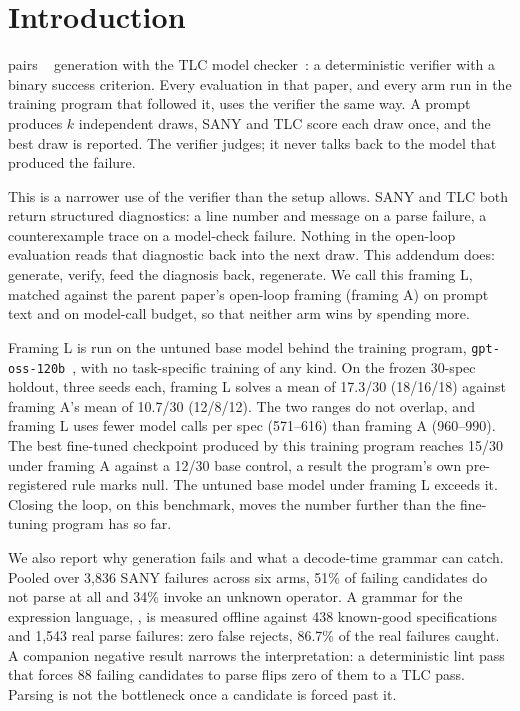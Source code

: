 \section{Introduction}\label{sec:introduction}

\ours{} pairs \tlaplus{}~\cite{lamport2002specifying} generation with the TLC
model checker~\cite{yu1999tlc}: a deterministic verifier with a binary success
criterion. Every evaluation in that paper, and every arm run in the training
program that followed it, uses the verifier the same way. A prompt produces
$k$ independent draws, SANY and TLC score each draw once, and the best draw is
reported. The verifier judges; it never talks back to the model that produced
the failure.

This is a narrower use of the verifier than the setup allows. SANY and TLC
both return structured diagnostics: a line number and message on a parse
failure, a counterexample trace on a model-check failure. Nothing in the
open-loop evaluation reads that diagnostic back into the next draw. This
addendum does: generate, verify, feed the diagnosis back, regenerate. We call
this framing L, matched against the parent paper's open-loop framing (framing
A) on prompt text and on model-call budget, so that neither arm wins by
spending more.

Framing L is run on the untuned base model behind the training program,
\texttt{gpt-oss-120b}~\cite{openai2025gptoss}, with no task-specific training
of any kind. On the frozen 30-spec holdout, three seeds each, framing L solves
a mean of 17.3/30 (18/16/18) against framing A's mean of 10.7/30 (12/8/12).
The two ranges do not overlap, and framing L uses fewer model calls per spec
(571--616) than framing A (960--990). The best fine-tuned checkpoint produced
by this training program reaches 15/30 under framing A against a 12/30 base
control, a result the program's own pre-registered rule marks null. The
untuned base model under framing L exceeds it. Closing the loop, on this
benchmark, moves the number further than the fine-tuning program has so far.

We also report why generation fails and what a decode-time grammar can catch.
Pooled over 3,836 SANY failures across six arms, 51\% of failing candidates do
not parse at all and 34\% invoke an unknown operator. A grammar for the
\tlaplus{} expression language, \gfile{}, is measured
offline against 438 known-good specifications and 1,543 real parse failures:
zero false rejects, 86.7\% of the real failures caught. A companion negative
result narrows the interpretation: a deterministic lint pass that forces 88
failing candidates to parse flips zero of them to a TLC pass. Parsing is not
the bottleneck once a candidate is forced past it.

